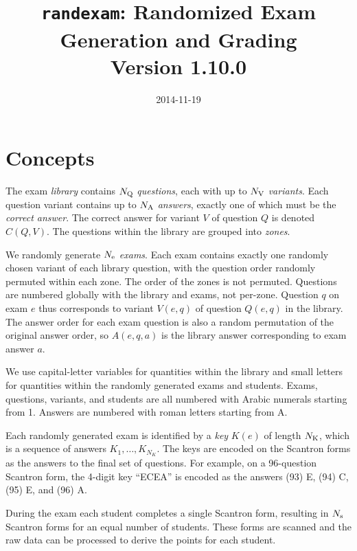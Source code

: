 \documentclass{article}
\begin{document}
\title{\texttt{randexam}: Randomized Exam Generation and Grading\\[1em] \Large Version 1.10.0}
\date{\vspace*{-2em}2014-11-19}
\maketitle

\section{Concepts}

The exam \emph{library} contains $N_{\rm Q}$ \emph{questions}, each
with up to $N_{\rm V}$ \emph{variants}. Each question variant contains
up to $N_{\rm A}$ \emph{answers}, exactly one of which must be the
\emph{correct answer}. The correct answer for variant $V$ of question
$Q$ is denoted $C(Q,V)$. The questions within the library are grouped
into \emph{zones}.

We randomly generate $N_{\rm e}$ \emph{exams}. Each exam contains
exactly one randomly chosen variant of each library question, with the
question order randomly permuted within each zone. The order of the
zones is not permuted. Questions are numbered globally with the
library and exams, not per-zone. Question $q$ on exam $e$ thus
corresponds to variant $V(e,q)$ of question $Q(e,q)$ in the
library. The answer order for each exam question is also a random
permutation of the original answer order, so $A(e,q,a)$ is the library
answer corresponding to exam answer $a$.

We use capital-letter variables for quantities within the library
and small letters for quantities within the randomly generated exams
and students. Exams, questions, variants, and students are all
numbered with Arabic numerals starting from 1. Answers are numbered
with roman letters starting from A.

Each randomly generated exam is identified by a \emph{key} $K(e)$ of
length $N_{\rm K}$, which is a sequence of answers
$K_1,\ldots,K_{N_K}$. The keys are encoded on the Scantron forms as
the answers to the final set of questions. For example, on a
96-question Scantron form, the 4-digit key ``ECEA'' is encoded as the
answers (93) E, (94) C, (95) E, and (96) A.

During the exam each student completes a single Scantron form,
resulting in $N_{\rm s}$ Scantron forms for an equal number of
students. These forms are scanned and the raw data can be processed to
derive the points for each student.
\end{document}
